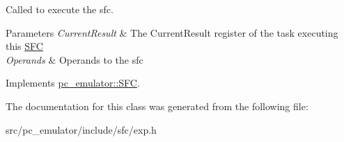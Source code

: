 Called to execute the sfc. 


\begin{DoxyParams}{Parameters}
{\em Current\+Result} & The Current\+Result register of the task executing this \hyperlink{classpc__emulator_1_1SFC}{S\+FC} \\
\hline
{\em Operands} & Operands to the sfc \\
\hline
\end{DoxyParams}


Implements \hyperlink{classpc__emulator_1_1SFC_ab206c80fc0e429c56672b4f6a0ca8635}{pc\+\_\+emulator\+::\+S\+FC}.



The documentation for this class was generated from the following file\+:\begin{DoxyCompactItemize}
\item 
src/pc\+\_\+emulator/include/sfc/exp.\+h\end{DoxyCompactItemize}
